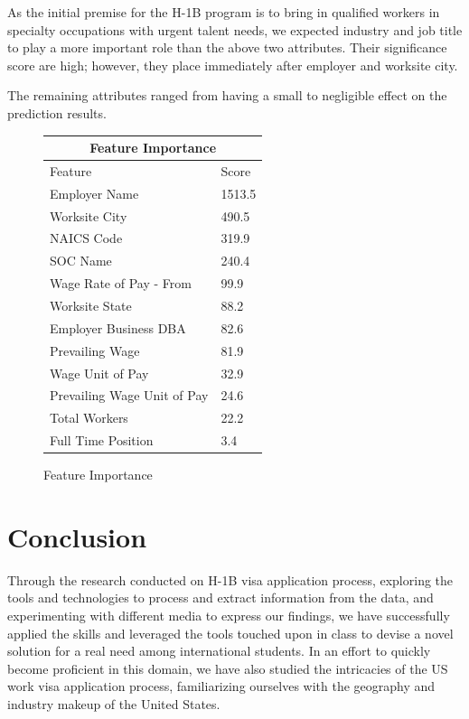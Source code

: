 \documentclass[sigconf]{acmart}
\begin{document}
As the initial premise for the H-1B program is to bring in qualified workers in specialty 
occupations with urgent 
talent needs, we expected industry and job title to play a more important role than 
the above two attributes. Their significance 
score are high; however, they place immediately after employer and worksite city. 


The remaining attributes ranged from having a small to negligible effect on the prediction results. 


\begin{figure}
  \begin{tabular}{ |p{4cm}||p{2cm}|  }
    \hline
    \multicolumn{2}{|c|}{\textbf{Feature Importance}} \\
    \hline
    Feature & Score\\
    \hline
    Employer Name & 1513.5\\
    Worksite City & 490.5\\
    NAICS Code & 319.9\\
    SOC Name & 240.4\\
    Wage Rate of Pay - From & 99.9\\
    Worksite State & 88.2\\
    Employer Business DBA & 82.6\\
    Prevailing Wage & 81.9\\
    Wage Unit of Pay & 32.9\\
    Prevailing Wage Unit of Pay & 24.6\\
    Total Workers & 22.2\\
    Full Time Position & 3.4\\
    \hline
   \end{tabular}
  \caption{Feature Importance}
   \label{fig:featureimportance}
\end{figure}


\section{Conclusion} 

Through the research conducted on H-1B visa application process, exploring the tools and technologies 
to process and extract information from the data, and experimenting with different media to 
express our findings, we have successfully applied the skills and leveraged the tools touched 
upon in class to devise a novel solution for a real need among international students. 
In an effort to quickly become proficient in this domain, we have also studied 
the intricacies of the US work visa application process, familiarizing ourselves 
with the geography and industry makeup of the United States. 
\end{document}

